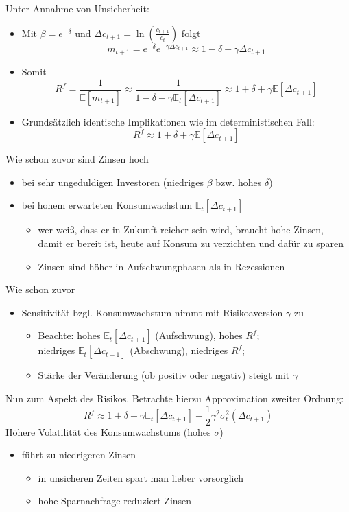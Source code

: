 \documentclass[12pt]{extreport} %
\theoremstyle{named}
\theoremstyle{nnamed}
\theoremstyle{itshape}
\theoremstyle{normal}
\begin{document}
Unter Annahme von Unsicherheit:	
\begin{itemize}
	\item Mit $\beta = e^{-\delta}$ und $\Delta c_{t+1} = \ln \left( \frac{c_{t+1}}{c_t} \right)$ folgt
		$$ m_{t+1} = e^{-\delta} e^{-\gamma \Delta c_{t+1}} \approx 1 - \delta - \gamma \Delta c_{t+1} $$
	\item Somit
		$$ R^f = \frac{1}{\mathbb{E}[m_{t+1}]} \approx \frac{1}{1 - \delta - \gamma \mathbb{E}_t[\Delta c_{t+1}]} \approx 1 + \delta + \gamma \mathbb{E}[\Delta c_{t+1}] $$
	\item Grundsätzlich identische Implikationen wie im deterministischen Fall:
		$$ R^f \approx 1 + \delta + \gamma \mathbb{E} [\Delta c_{t+1}] $$
\end{itemize}
Wie schon zuvor sind Zinsen hoch
\begin{itemize}
			\item bei sehr ungeduldigen Investoren (niedriges $\beta$ bzw. hohes $\delta$)
			\item bei hohem erwarteten Konsumwachstum $\mathbb{E}_t[\Delta c_{t+1}]$
				\begin{itemize}
					\item wer weiß, dass er in Zukunft reicher sein wird, braucht hohe Zinsen, damit er bereit ist, heute auf Konsum zu verzichten und dafür zu sparen
					\item Zinsen sind höher in Aufschwungphasen als in Rezessionen
				\end{itemize}
\end{itemize}
Wie schon zuvor
\begin{itemize}
	\item Sensitivität bzgl. Konsumwachstum nimmt mit Risikoaversion $\gamma$ zu
		\begin{itemize}
			\item Beachte: hohes $\mathbb{E}_t[\Delta c_{t+1}]$ (Aufschwung), hohes $R^f$; ~\\
				niedriges $\mathbb{E}_t[\Delta c_{t+1}]$ (Abschwung), niedriges $R^f$;
			\item Stärke der Veränderung (ob positiv  oder negativ) steigt mit $\gamma$
		\end{itemize}
\end{itemize}

Nun zum Aspekt des Risikos. Betrachte hierzu Approximation zweiter Ordnung:
	$$	R^f \approx 1 + \delta + \gamma \mathbb{E}_t[\Delta c_{t+1}] - \frac{1}{2} \gamma^2 \sigma^2_t (\Delta c_{t+1}) $$
Höhere Volatilität des Konsumwachstums (hohes $\sigma$)
\begin{itemize}
	\item führt zu niedrigeren Zinsen
		\begin{itemize}
			\item in unsicheren Zeiten spart man lieber vorsorglich
			\item hohe Sparnachfrage reduziert Zinsen
		\end{itemize}
\end{itemize}
\end{document}
